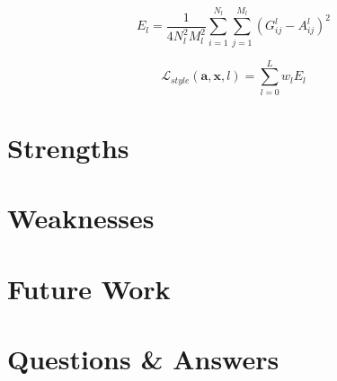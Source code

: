 \documentclass{article}
\begin{document}
\begin{equation}
E_l =
\frac{1}{4 N_l^2 M_l^2}
\sum_{i=1}^{N_l}\sum_{j=1}^{M_l}
(G^l_{ij} - A^l_{ij})^2
\end{equation}

\begin{equation}
\mathcal{L}_{style}(\mathbf{a}, \mathbf{x}, l) = \sum_{l=0}^L w_l E_l
\end{equation}


\hypertarget{strengths}{%
\section{Strengths}\label{strengths}}

\hypertarget{weaknesses}{%
\section{Weaknesses}\label{weaknesses}}

\hypertarget{future-work}{%
\section{Future Work}\label{future-work}}

\hypertarget{qa}{%
\section{Questions \& Answers}\label{qa}}




\begin{acronym}
\end{acronym}
\end{document}
